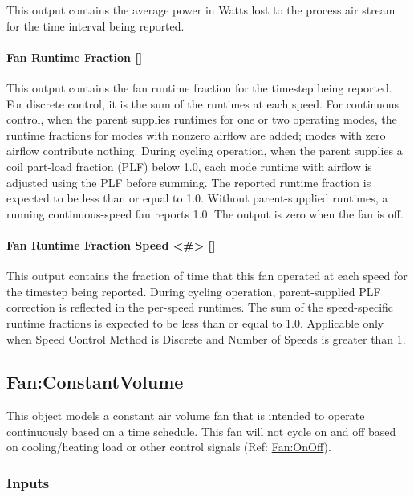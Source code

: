 This output contains the average power in Watts lost to the process air stream for the time interval being reported.

\paragraph{Fan Runtime Fraction {[]}}\label{fan-runtime-fraction-fansysmodel}

This output contains the fan runtime fraction for the timestep being reported. For discrete control, it is the sum of the runtimes at each speed. For continuous control, when the parent supplies runtimes for one or two operating modes, the runtime fractions for modes with nonzero airflow are added; modes with zero airflow contribute nothing. During cycling operation, when the parent supplies a coil part-load fraction (PLF) below 1.0, each mode runtime with airflow is adjusted using the PLF before summing. The reported runtime fraction is expected to be less than or equal to 1.0. Without parent-supplied runtimes, a running continuous-speed fan reports 1.0. The output is zero when the fan is off.

\paragraph{Fan Runtime Fraction Speed <\#> {[]}}\label{fan-runtime-fraction-speed-fansysmodel}

This output contains the fraction of time that this fan operated at each speed for the timestep being reported. During cycling operation, parent-supplied PLF correction is reflected in the per-speed runtimes. The sum of the speed-specific runtime fractions is expected to be less than or equal to 1.0. Applicable only when Speed Control Method is Discrete and Number of Speeds is greater than 1.

\subsection{Fan:ConstantVolume}\label{fanconstantvolume}

This object models a constant air volume fan that is intended to operate continuously based on a time schedule. This fan will not cycle on and off based on cooling/heating load or other control signals (Ref: \hyperref[fanonoff]{Fan:OnOff}).

\subsubsection{Inputs}\label{inputs-019}

